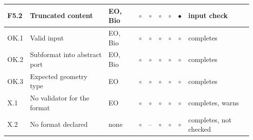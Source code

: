 \begin{tabular}{lllcccccl}
F5.2 & Truncated content & EO, Bio & $\circ$ & $\circ$ & $\circ$ & $\circ$ & $\bullet$ & input check \\
\midrule
OK.1 & Valid input & EO, Bio & $\circ$ & $\circ$ & $\circ$ & $\circ$ & $\circ$ & completes \\
OK.2 & Subformat into abstract port & EO, Bio & $\circ$ & $\circ$ & $\circ$ & $\circ$ & $\circ$ & completes \\
OK.3 & Expected geometry type & EO & $\circ$ & $\circ$ & $\circ$ & $\circ$ & $\circ$ & completes \\
\midrule
X.1 & No validator for the format & EO & $\circ$ & $\circ$ & $\circ$ & $\circ$ & $\circ$ & completes, warns \\
X.2 & No format declared & none & $\circ$ & -- & $\circ$ & $\circ$ & $\circ$ & completes, not checked \\
\bottomrule
\end{tabular}
